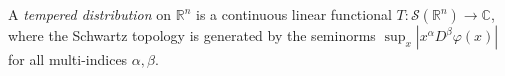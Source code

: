 
A \emph{tempered distribution} on $\mathbb R^n$ is a continuous linear functional $T:\mathcal S(\mathbb R^n)\to\mathbb C$, where the Schwartz topology is generated by the seminorms $\sup_x|x^\alpha D^\beta\varphi(x)|$ for all multi-indices $\alpha,\beta$.

